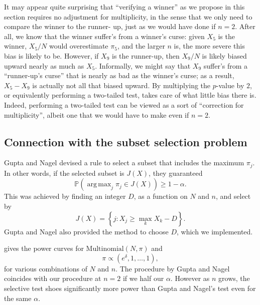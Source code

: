 \documentclass[11pt]{article}
\DeclareMathOperator*{\argmax}{arg\,max}
\newcommand{\PP}{\mathbb{P}}
\begin{document}
It may appear quite surprising that ``verifying a winner'' as we propose in this section requires no adjustment for multiplicity, in the sense that we only need to compare the winner to the runner- up, just as we would have done if $n = 2$. After all, we know that the winner suffer’s from a winner's curse: given $X_5$ is the winner, $X_5 / N$ would overestimate $\pi_5$, and the larger $n$ is, the more severe this bias is likely to be. However, if $X_9$ is the runner-up, then $X_9 / N$ is likely biased upward nearly as much as $X_5$. Informally, we might say that $X_9$ suffer’s from a “runner-up’s curse” that is nearly as bad as the winner's curse; as a result, $X_5 - X_9$ is actually not all that biased upward. By multiplying the $p$-value by $2$, or equivalently performing a two-tailed test, takes care of what little bias there is. Indeed, performing a two-tailed test can be viewed as a sort of ``correction for multiplicity'', albeit one that we would have to make even if $n = 2$.

\subsection{Connection with the subset selection problem}
\label{sec:compare_subset}

Gupta and Nagel \cite{Gupta:1967wg} devised a rule to select a subset that includes the maximum $\pi_j$. In other words, if the selected subset is $J\left(X\right)$, they guaranteed
$$\PP\left(\argmax_j \pi_j \in J\left(X\right)\right) \ge 1 - \alpha.$$
This was achieved by finding an integer $D$, as a function on $N$ and $n$, and select by
$$J\left(X\right) = \left\{j: X_j \ge \max_k X_k - D\right\}.$$
Gupta and Nagel also provided the method to choose $D$, which we implemented. 

 gives the power curves for $\text{Multinomial}\left(N, \pi\right)$ and
$$\pi \propto \left(e^\delta, 1, \ldots, 1\right),$$
for various combinations of $N$ and $n$. The procedure by Gupta and Nagel coincides with our procedure at $n = 2$ if we half our $\alpha$. However as $n$ grows, the selective test shoes significantly more power than Gupta and Nagel's test even for the same $\alpha$.
\end{document}
